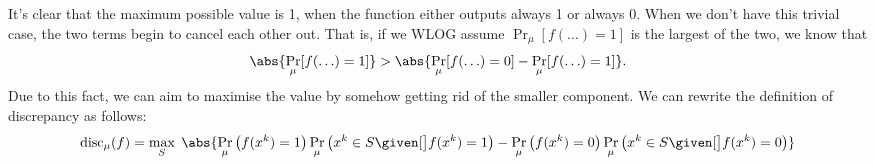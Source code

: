 \documentclass{article}
\begin{document}
\begin{enumerate}
\begin{enumerate}
            It's clear that the maximum possible value is 1, when the function
            either outputs always 1 or always 0. When we don't have this
            trivial case, the two terms begin to cancel each other out.
            That is, if we WLOG assume $\Pr_\mu[f(\ldots) = 1]$ is the largest
            of the two, we know that $$\abs{ \Pr_\mu[f(\ldots) = 1] } > \abs{
            \Pr_\mu[f(\ldots) = 0] - \Pr_\mu[f(\ldots) = 1] }.$$ Due to this
            fact, we can aim to maximise the value by somehow getting rid of
            the smaller component. We can rewrite the definition of discrepancy
            as follows:
            $$ \textrm{disc}_\mu(f) = \max_S\; \abs{ \Pr_\mu \left(f(x^k) =
            1\right) \Pr_\mu \left(x^k \in S \given[\big] f(x^k) = 1\right) -
            \Pr_\mu \left(f(x^k) = 0\right) \Pr_\mu \left(x^k \in S
            \given[\big] f(x^k) = 0\right) }$$


\end{enumerate}
\end{enumerate}
\end{document}
